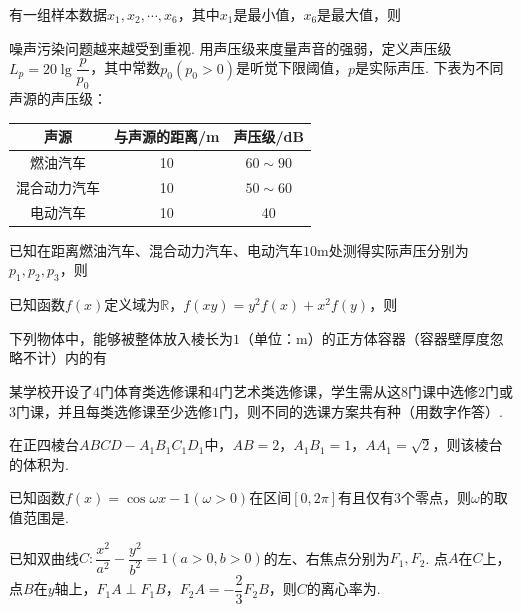 \documentclass[a4paper,11pt]{report}
\begin{document}
\begin{examquestions}[start=9]
\item 有一组样本数据$x_1,x_2,\cdots,x_6$，其中$x_1$是最小值，$x_6$是最大值，则
\item 噪声污染问题越来越受到重视. 用声压级来度量声音的强弱，定义声压级$L_p=20\lg\dfrac{p}{p_0}$，其中常数$p_0(p_0>0)$是听觉下限阈值，$p$是实际声压. 下表为不同声源的声压级：
\begin{tightcenter}\begin{tabular}{|c|c|c|}\hline 声源&与声源的距离/m&声压级/dB\\\hline 燃油汽车&10&$60\sim90$\\\hline 混合动力汽车&10&$50\sim60$\\\hline 电动汽车&10&40\\\hline\end{tabular}\end{tightcenter}
已知在距离燃油汽车、混合动力汽车、电动汽车$10$m处测得实际声压分别为$p_1,p_2,p_3$，则
\item 已知函数$f(x)$定义域为$\mathbb R$，$f(xy)=y^2f(x)+x^2f(y)$，则
\item 下列物体中，能够被整体放入棱长为$1$（单位：m）的正方体容器（容器壁厚度忽略不计）内的有
\end{examquestions}

\begin{examquestions}[start=13]
\item 某学校开设了$4$门体育类选修课和$4$门艺术类选修课，学生需从这$8$门课中选修$2$门或$3$门课，并且每类选修课至少选修$1$门，则不同的选课方案共有\blank 种（用数字作答）. 
\item 在正四棱台$ABCD-A_1B_1C_1D_1$中，$AB=2$，$A_1B_1=1$，$AA_1=\sqrt2$，则该棱台的体积为\blank. 
\item 已知函数$f(x)=\cos\omega x-1(\omega>0)$在区间$[0,2\pi]$有且仅有$3$个零点，则$\omega$的取值范围是\blank. 
\item 已知双曲线$C:\dfrac{x^2}{a^2}-\dfrac{y^2}{b^2}=1(a>0,b>0)$的左、右焦点分别为$F_1,F_2$. 点$A$在$C$上，点$B$在$y$轴上，$F_1A\perp F_1B$，$F_2A=-\dfrac23F_2B$，则$C$的离心率为\blank. 
\end{examquestions}
\end{document}
